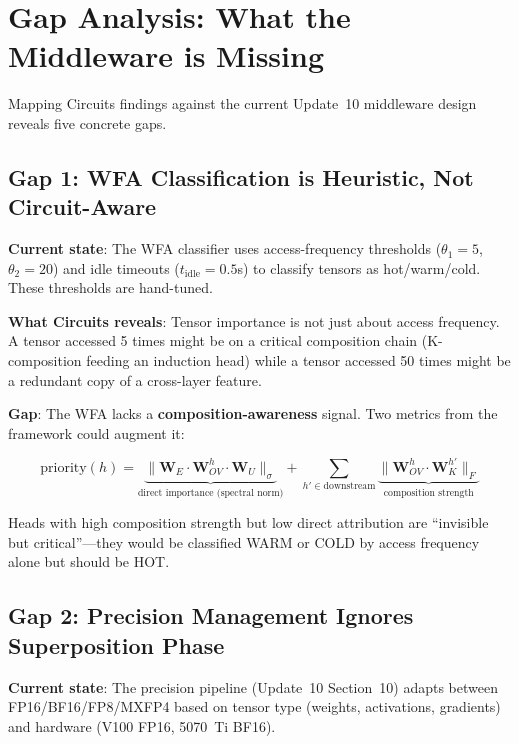 \documentclass[11pt,letterpaper]{article}
\begin{document}
\section{Gap Analysis: What the Middleware is Missing}
\label{sec:gaps}

Mapping Circuits findings against the current Update~10 middleware design reveals five concrete gaps.

\subsection{Gap 1: WFA Classification is Heuristic, Not Circuit-Aware}

\textbf{Current state}: The WFA classifier uses access-frequency thresholds ($\theta_1 = 5$, $\theta_2 = 20$) and idle timeouts ($t_{\text{idle}} = 0.5$s) to classify tensors as hot/warm/cold. These thresholds are hand-tuned.

\textbf{What Circuits reveals}: Tensor importance is not just about access frequency. A tensor accessed 5 times might be on a critical composition chain (K-composition feeding an induction head) while a tensor accessed 50 times might be a redundant copy of a cross-layer feature.

\textbf{Gap}: The WFA lacks a \textbf{composition-awareness} signal. Two metrics from the framework could augment it:

\begin{equation}
    \text{priority}(h) = \underbrace{\|\mathbf{W}_E \cdot \mathbf{W}_{OV}^h \cdot \mathbf{W}_U\|_\sigma}_{\text{direct importance (spectral norm)}} + \sum_{h' \in \text{downstream}} \underbrace{\|\mathbf{W}_{OV}^h \cdot \mathbf{W}_K^{h'}\|_F}_{\text{composition strength}}
\end{equation}

Heads with high composition strength but low direct attribution are ``invisible but critical''---they would be classified WARM or COLD by access frequency alone but should be HOT.

\subsection{Gap 2: Precision Management Ignores Superposition Phase}

\textbf{Current state}: The precision pipeline (Update~10 Section~10) adapts between FP16/BF16/FP8/MXFP4 based on tensor type (weights, activations, gradients) and hardware (V100 FP16, 5070~Ti BF16).
\end{document}

